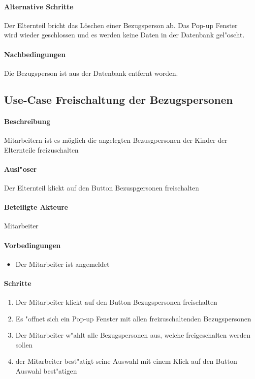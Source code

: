 		\paragraph{Alternative Schritte}
		Der Elternteil bricht das Löschen einer Bezugsperson ab. Das Pop-up Fenster wird wieder geschlossen und es werden keine Daten in der Datenbank gel"oscht. 	
		\paragraph{Nachbedingungen}
		Die Bezugsperson ist aus der Datenbank entfernt worden. 
  
  
  
	\newpage
	\subsection{Use-Case Freischaltung der Bezugspersonen}
		\paragraph{Beschreibung}
		Mitarbeitern ist es möglich die angelegten Bezusgpersonen der Kinder der Elternteile freizuschalten
		\paragraph{Ausl"oser}
		Der Elternteil klickt auf den Button \dq Bezuspgersonen freischalten\dq
		\paragraph{Beteiligte Akteure}   \leavevmode \newline
		Mitarbeiter
		\paragraph{Vorbedingungen}
		\begin{itemize}
		 	\item Der Mitarbeiter ist angemeldet
		\end{itemize}
		
		\paragraph{Schritte}
		\begin{enumerate}
		 	\item Der Mitarbeiter klickt auf den Button \dq Bezugspersonen freischalten\dq
		 	\item Es "offnet sich ein Pop-up Fenster mit allen freizuschaltenden Bezugspersonen
		 	\item Der Mitarbeiter w"ahlt alle Bezugspersonen aus, welche freigeschalten werden sollen
		 	\item der Mitarbeiter best"atigt seine Auswahl mit einem Klick auf den Button \dq Auswahl best"atigen\dq
		\end{enumerate}
		
